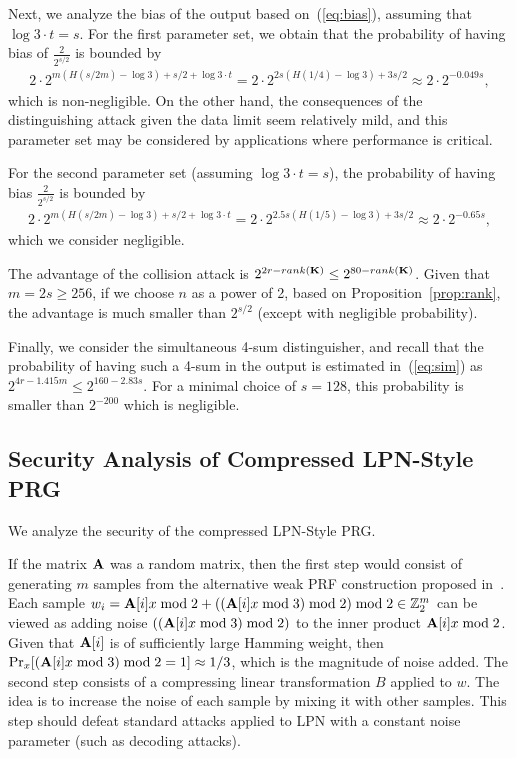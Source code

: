 Next, we analyze the bias of the output based on~(\ref{eq:bias}),
assuming that $\log 3 \cdot t = s$.
For the first parameter set,
we obtain that the probability of having bias of $\tfrac{2}{2^{s/2}}$ is bounded by
\begin{align*}
2 \cdot 2^{m (H(s/2m) - \log 3) + s/2 + \log 3 \cdot t} =
2 \cdot 2^{2s (H(1/4) - \log 3) + 3s/2} \approx
2 \cdot 2^{-0.049s},
\end{align*}
which is non-negligible.
On the other hand, the consequences of the distinguishing attack given the data limit
seem relatively mild, and this parameter set may be considered by applications
where performance is critical.

For the second parameter set (assuming $\log 3 \cdot t = s$),
the probability of having bias $\tfrac{2}{2^{s/2}}$ is bounded by
\begin{align*}
2 \cdot 2^{m (H(s/2m) - \log 3) + s/2 + \log 3 \cdot t} =
2 \cdot 2^{2.5s (H(1/5) - \log 3) + 3s/2} \approx
2 \cdot 2^{-0.65s},
\end{align*}
which we consider negligible.

The advantage of the collision attack is $2^{2r - rank(\mat{K})} \leq 2^{80 - rank(\mat{K})}$.
Given that $m = 2s \geq 256$, if we choose $n$ as a power of 2,
based on Proposition~\ref{prop:rank},
the advantage is much smaller than $2^{s/2}$ (except with negligible probability).

Finally, we consider the simultaneous 4-sum distinguisher,
and recall that the probability of having such a 4-sum in the output is estimated
in~(\ref{eq:sim}) as $2^{4r - 1.415 m} \leq 2^{160 - 2.83s}$.
For a minimal choice of $s = 128$, this probability is smaller than $2^{-200}$
which is negligible.



\subsection{Security Analysis of Compressed LPN-Style PRG}

We analyze the security of the compressed LPN-Style PRG.

If the matrix $\mat{A}$ was a random matrix, then
the first step would consist of generating $m$ samples from the alternative weak PRF construction proposed
in~\cite{boneh2018-darkmatter}. Each sample
$w_i = \mat{A}[i] x \bmod 2 + ((\mat{A}[i] x \bmod 3) \bmod 2) \bmod 2 \in \Z_2^m$
can be viewed as adding noise $((\mat{A}[i] x \bmod 3) \bmod 2)$ to the inner product $\mat{A}[i] x \bmod 2$.
Given that $\mat{A}[i]$ is of sufficiently large Hamming weight, then
$\Pr_x[(\mat{A}[i] x \bmod 3) \bmod 2 = 1] \approx 1/3$, which is the magnitude of noise added.
The second step consists of a compressing linear transformation $B$ applied to $w$.
The idea is to increase the noise of each sample by mixing it with other samples.
This step should defeat standard attacks applied to LPN with a constant noise parameter
(such as decoding attacks).

